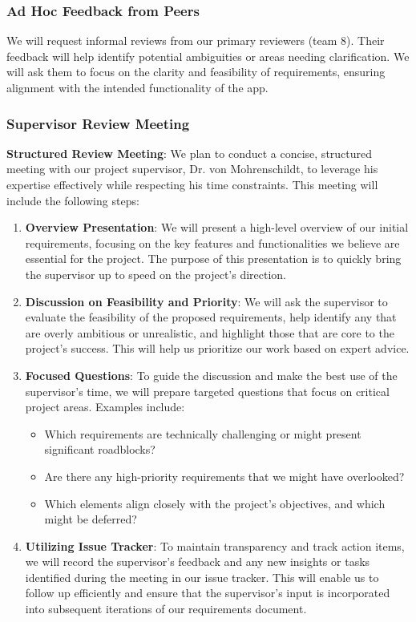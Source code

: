 \documentclass[12pt, titlepage]{article}
\begin{document}
\subsubsection{Ad Hoc Feedback from Peers}
We will request informal reviews from our primary reviewers (team 8). Their feedback will help identify potential 
ambiguities or areas needing clarification. We will ask them to focus on the clarity and feasibility of requirements, 
ensuring alignment with the intended functionality of the app.

\subsubsection{Supervisor Review Meeting}

\textbf{Structured Review Meeting}: We plan to conduct a concise, structured meeting with our project supervisor, Dr. 
von Mohrenschildt, to leverage his expertise effectively while respecting his time constraints. This meeting will 
include the following steps:

\begin{enumerate}
    \item \textbf{Overview Presentation}: We will present a high-level overview of our initial requirements, focusing 
    on the key features and functionalities we believe are essential for the project. The purpose of this presentation 
    is to quickly bring the supervisor up to speed on the project's direction.
    
    \item \textbf{Discussion on Feasibility and Priority}: We will ask the supervisor to evaluate the feasibility of 
    the proposed requirements, help identify any that are overly ambitious or unrealistic, and highlight those that 
    are core to the project’s success. This will help us prioritize our work based on expert advice.
    
    \item \textbf{Focused Questions}: To guide the discussion and make the best use of the supervisor’s time, we will 
    prepare targeted questions that focus on critical project areas. Examples include:
    \begin{itemize}
        \item Which requirements are technically challenging or might present significant roadblocks?
        \item Are there any high-priority requirements that we might have overlooked?
        \item Which elements align closely with the project’s objectives, and which might be deferred?
    \end{itemize}
    
    \item \textbf{Utilizing Issue Tracker}: To maintain transparency and track action items, we will record the supervisor’s 
    feedback and any new insights or tasks identified during the meeting in our issue tracker. This will enable us to follow 
    up efficiently and ensure that the supervisor's input is incorporated into subsequent iterations of our requirements document.
\end{enumerate}
\end{document}
